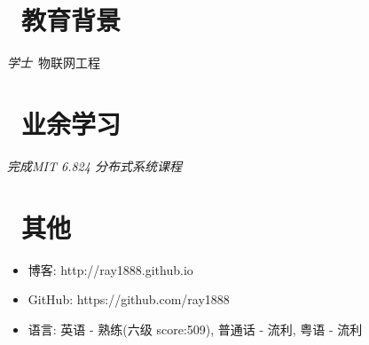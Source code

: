 \documentclass{resume}
\begin{document}
\section{\faGraduationCap\  教育背景}
\textit{学士}\ 物联网工程

\section{\faHeartO\ 业余学习}
\textit{完成MIT 6.824 分布式系统课程}

\section{\faInfo\ 其他}
\begin{itemize}[parsep=0.5ex]
    \item 博客: http://ray1888.github.io 
    \item GitHub: https://github.com/ray1888
    \item 语言: 英语 - 熟练(六级 score:509), 普通话 - 流利, 粤语 - 流利
\end{itemize}

%
%
\end{document}
